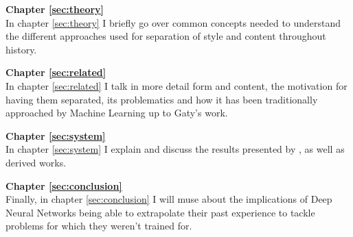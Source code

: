 \textbf{Chapter \ref{sec:theory}} \\[0.2em]
In chapter \ref{sec:theory} I briefly go over common concepts needed to understand the different approaches used for separation of style and content throughout history.

\textbf{Chapter \ref{sec:related}} \\[0.2em]
In chapter \ref{sec:related} I talk in more detail form and content, the motivation for having them separated, its problematics and how it has been traditionally approached by Machine Learning up to Gaty's work.

\textbf{Chapter \ref{sec:system}} \\[0.2em]
In chapter \ref{sec:system} I explain and discuss the results presented by \cite{Gatys2015}, as well as derived works.

\textbf{Chapter \ref{sec:conclusion}} \\[0.2em]
Finally, in chapter \ref{sec:conclusion} I will muse about the implications of Deep Neural Networks being able to extrapolate their past experience to tackle problems for which they weren't trained for.
